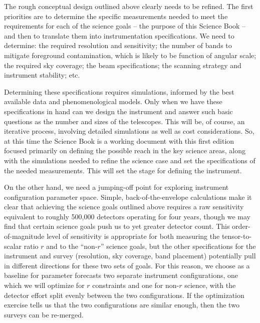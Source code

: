 The rough conceptual design outlined above clearly needs to be refined.  The first priorities are to determine the specific measurements needed to meet the requirements for each of the science goals -- the purpose of this Science Book -- and then to translate them into instrumentation specifications. We need to determine:  the required resolution and sensitivity; the number of bands to mitigate foreground contamination, which is likely to be function of angular scale; the required sky coverage; the beam specifications; the scanning strategy and instrument stability; etc. 

Determining these specifications requires simulations, informed by the best available data and phenomenological models.  Only when we have these specifications in hand can we design the instrument and answer such basic questions as the number and sizes of the telescopes.  This will be, of course, an iterative process, involving detailed simulations as well as cost considerations. So, at this time the Science Book is a working document with this first edition focused primarily on defining the possible reach in the  key science areas, along with the simulations needed to refine the science case and set the specifications of the needed measurements. This will set the stage for defining the instrument.



On the other hand, we need a jumping-off point for exploring instrument configuration parameter space.  
Simple, back-of-the-envelope calculations make it clear that achieving the science goals outlined above requires a raw sensitivity equivalent to roughly 500,000 detectors operating for four years, though we may find that certain science goals push us to yet greater detector count. This order-of-magnitude level of sensitivity is appropriate for both measuring the tensor-to-scalar ratio $r$ and to the ``non-$r$'' science goals, but the other specifications for the instrument and survey (resolution, sky coverage, band placement) potentially pull in different directions for these two sets of goals. For this reason, we choose as a baseline for parameter forecasts two separate instrument configurations, one which we will optimize for $r$ constraints and one for non-$r$ science, with the detector effort split evenly between the two configurations. If the optimization exercise tells us that the two configurations are similar enough, then the two surveys can be re-merged. 

